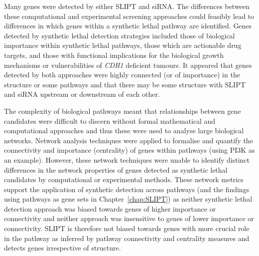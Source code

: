 Many genes were detected by either \gls{SLIPT} and \gls{siRNA}.  The differences between these computational and experimental screening approaches could feasibly lead to differences in which genes within a \gls{synthetic lethal} \gls{pathway} are identified. Genes detected by \gls{synthetic lethal} detection strategies included those of biological importance within \gls{synthetic lethal} \glspl{pathway}, those which are actionable drug targets, and those with functional implications for the biological growth mechanisms or vulnerabilities of \textit{CDH1} deficient tumours. It appeared that genes detected by both approaches were highly connected (or of importance) in the  structure or some \glspl{pathway} and that there may be some structure with \gls{SLIPT} and \gls{siRNA} upstream or downstream of each other. 

The complexity of biological \glspl{pathway} meant that relationships between gene candidates were difficult to discern without formal mathematical and computational approaches and thus these were used to analyse large biological networks. Network analysis techniques were applied to formalise and quantify the connectivity and importance (centrality) of genes within \glspl{pathway} (using \gls{PI3K} as an example). However, these network techniques were unable to identify distinct differences in the network properties of genes detected as \gls{synthetic lethal} candidates by computational or experimental methods. These network metrics support the application of synthetic detection across \glspl{pathway} (and the findings using \glspl{pathway} as gene sets in Chapter~\ref{chap:SLIPT}) as neither \gls{synthetic lethal} detection approach was biased towards genes of higher importance or connectivity and neither approach was insensitive to genes of lower  importance or connectivity. \gls{SLIPT} is therefore not biased towards genes with  more crucial role in the \gls{pathway} as inferred by \gls{pathway} connectivity and \gls{centrality} measures and detects genes irrespective of  structure. 



